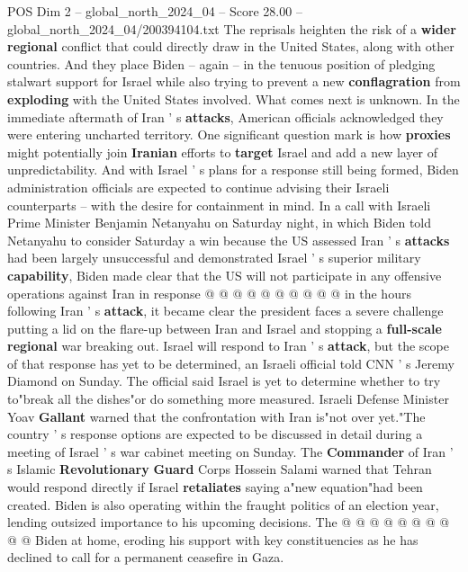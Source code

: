 \begin{textsample}{POS Dim 2 – global\_north\_2024\_04 – Score 28.00 – global\_north\_2024\_04/200394104.txt}  \label{ex:f2_pos_168}
The reprisals heighten the risk of a \textbf{wider} \textbf{regional} conflict that could directly draw in the United States, along with other countries.
And they place Biden -- again -- in the tenuous position of pledging stalwart support for Israel while also trying to prevent a new \textbf{conflagration} from \textbf{exploding} with the United States involved.
What comes next is unknown.
In the immediate aftermath of Iran ' s \textbf{attacks}, American officials acknowledged they were entering uncharted territory.
One significant question mark is how \textbf{proxies} might potentially join \textbf{Iranian} efforts to \textbf{target} Israel and add a new layer of unpredictability.
And with Israel ' s plans for a response still being formed, Biden administration officials are expected to continue advising their Israeli counterparts -- with the desire for containment in mind.
In a call with Israeli Prime Minister Benjamin Netanyahu on Saturday night, in which Biden told Netanyahu to consider Saturday a win because the US assessed Iran ' s \textbf{attacks} had been largely unsuccessful and demonstrated Israel ' s superior military \textbf{capability}, Biden made clear that the US will not participate in any offensive operations against Iran in response @ @ @ @ @ @ @ @ @ @ in the hours following Iran ' s \textbf{attack}, it became clear the president faces a severe challenge putting a lid on the flare-up between Iran and Israel and stopping a \textbf{full-scale} \textbf{regional} war breaking out.
Israel will respond to Iran ' s \textbf{attack}, but the scope of that response has yet to be determined, an Israeli official told CNN ' s Jeremy Diamond on Sunday.
The official said Israel is yet to determine whether to try to"break all the dishes"or do something more measured.
Israeli Defense Minister Yoav \textbf{Gallant} warned that the confrontation with Iran is"not over yet."The country ' s response options are expected to be discussed in detail during a meeting of Israel ' s war cabinet meeting on Sunday.
The \textbf{Commander} of Iran ' s Islamic \textbf{Revolutionary} \textbf{Guard} Corps Hossein Salami warned that Tehran would respond directly if Israel \textbf{retaliates} saying a"new equation"had been created.
Biden is also operating within the fraught politics of an election year, lending outsized importance to his upcoming decisions.
The @ @ @ @ @ @ @ @ @ @ Biden at home, eroding his support with key constituencies as he has declined to call for a permanent ceasefire in Gaza.

\end{textsample}

